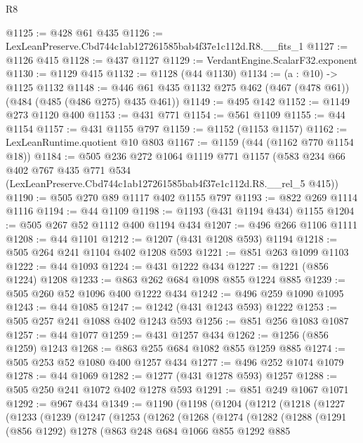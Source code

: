 \begin{lexlean}{R8}
\begin{coremodule}
@1125 := @428 @61 @435
@1126 := LexLeanPreserve.Cbd744c1ab127261585bab4f37e1c112d.R8.__fits_1
@1127 := @1126 @415
@1128 := @437 @1127
@1129 := VerdantEngine.ScalarF32.exponent
@1130 := @1129 @415
@1132 := @1128 (@44 @1130)
@1134 := (a : @10) -> @1125 @1132
@1148 := @446 @61 @435 @1132 @275 @462 (@467 (@478 @61)) (@484 (@485 (@486 @275) @435 @461))
@1149 := @495 @142
@1152 := @1149 @273 @1120 @400
@1153 := @431 @771
@1154 := @561 @1109
@1155 := @44 @1154
@1157 := @431 @1155 @797
@1159 := @1152 (@1153 @1157)
@1162 := LexLeanRuntime.quotient @10 @803
@1167 := @1159 (@44 (@1162 @770 @1154 @18))
@1184 := @505
    @236
    @272
    @1064
    @1119
    @771
    @1157
    (@583
      @234
      @66
      @402
      @767
      @435
      @771
      @534
      (LexLeanPreserve.Cbd744c1ab127261585bab4f37e1c112d.R8.__rel_5 @415))
@1190 := @505 @270 @89 @1117 @402 @1155 @797
@1193 := @822 @269 @1114 @1116
@1194 := @44 @1109
@1198 := @1193 (@431 @1194 @434) @1155
@1204 := @505 @267 @52 @1112 @400 @1194 @434
@1207 := @496 @266 @1106 @1111
@1208 := @44 @1101
@1212 := @1207 (@431 @1208 @593) @1194
@1218 := @505 @264 @241 @1104 @402 @1208 @593
@1221 := @851 @263 @1099 @1103
@1222 := @44 @1093
@1224 := @431 @1222 @434
@1227 := @1221 (@856 @1224) @1208
@1233 := @863 @262 @684 @1098 @855 @1224 @885
@1239 := @505 @260 @52 @1096 @400 @1222 @434
@1242 := @496 @259 @1090 @1095
@1243 := @44 @1085
@1247 := @1242 (@431 @1243 @593) @1222
@1253 := @505 @257 @241 @1088 @402 @1243 @593
@1256 := @851 @256 @1083 @1087
@1257 := @44 @1077
@1259 := @431 @1257 @434
@1262 := @1256 (@856 @1259) @1243
@1268 := @863 @255 @684 @1082 @855 @1259 @885
@1274 := @505 @253 @52 @1080 @400 @1257 @434
@1277 := @496 @252 @1074 @1079
@1278 := @44 @1069
@1282 := @1277 (@431 @1278 @593) @1257
@1288 := @505 @250 @241 @1072 @402 @1278 @593
@1291 := @851 @249 @1067 @1071
@1292 := @967 @434
@1349 := @1190
    (@1198
      (@1204
        (@1212
          (@1218
            (@1227
              (@1233
                (@1239
                  (@1247
                    (@1253
                      (@1262
                        (@1268
                          (@1274
                            (@1282
                              (@1288
                                (@1291
                                  (@856 @1292)
                                  @1278
                                  (@863
                                    @248
                                    @684
                                    @1066
                                    @855
                                    @1292
                                    @885

\end{coremodule}
\end{lexlean}
